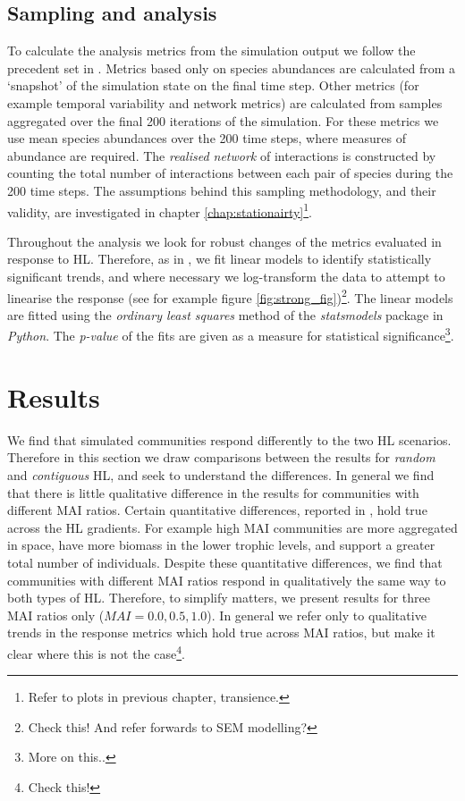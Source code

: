 \subsection{Sampling and analysis}
\label{sec:sampling}

To calculate the analysis metrics from the simulation output we follow the precedent set in \cite{lurgi2015effects}. Metrics based only on species abundances are calculated from a `snapshot' of the simulation state on the final time step. Other metrics (for example temporal variability and network metrics) are calculated from samples aggregated over the final 200 iterations of the simulation. For these metrics we use mean species abundances over the 200 time steps, where measures of abundance are required. The \emph{realised network} of interactions is constructed by counting the total number of interactions between each pair of species during the 200 time steps. The assumptions behind this sampling methodology, and their validity, are investigated in chapter \ref{chap:stationairty}\footnote{Refer to plots in previous chapter, transience.}.

Throughout the analysis we look for robust changes of the metrics evaluated in response to HL. Therefore, as in \cite{lurgi2015effects}, we fit linear models to identify statistically significant trends, and where necessary we log-transform the data to attempt to linearise the response (see for example figure \ref{fig:strong_fig})\footnote{Check this! And refer forwards to SEM modelling?}. The linear models are fitted using the \emph{ordinary least squares} method of the \emph{statsmodels} package in \emph{Python}. The \emph{p-value} of the fits are given as a measure for statistical significance\footnote{More on this..}.

\section{Results}
\label{sec:results}

We find that simulated communities respond differently to the two HL scenarios. Therefore in this section we draw comparisons between the results for \emph{random} and \emph{contiguous} HL, and seek to understand the differences. In general we find that there is little qualitative difference in the results for communities with different MAI ratios. Certain quantitative differences, reported in \cite{lurgi2015effects}, hold true across the HL gradients. For example high MAI communities are more aggregated in space, have more biomass in the lower trophic levels, and support a greater total number of individuals. Despite these quantitative differences, we find that communities with different MAI ratios respond in qualitatively the same way to both types of HL. Therefore, to simplify matters, we present results for three MAI ratios only ($MAI=0.0,0.5,1.0$). In general we refer only to qualitative trends in the response metrics which hold true across MAI ratios, but make it clear where this is not the case\footnote{Check this!}.

